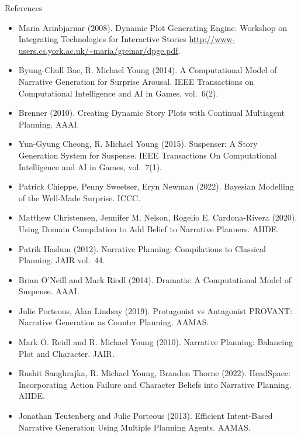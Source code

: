 \documentclass[utf8,13pt]{beamer}
\begin{document}
\begin{frame}{References}
  \footnotesize
  \begin{itemize}
  \item Maria Arinbjarnar (2008). Dynamic Plot Generating Engine.
    Workshop on Integrating Technologies for Interactive Stories
    \url{http://www-users.cs.york.ac.uk/~maria/greinar/dpge.pdf}.
  \item Byung-Chull Bae, R. Michael Young  (2014).
    A Computational Model of Narrative Generation for Surprise Arousal.
    IEEE Transactions on Computational Intelligence and AI in Games,
    vol.\ 6(2).
  \item Brenner (2010).
    Creating Dynamic Story Plots with Continual Multiagent Planning.
    AAAI.
  \item Yun-Gyung Cheong, R. Michael Young (2015).
    Suspenser: A Story Generation System for Suspense.
    IEEE Transactions On Computational Intelligence and AI in Games,
    vol.\ 7(1).
  \item Patrick Chieppe, Penny Sweetser, Eryn Newman (2022).
    Bayesian Modelling of the Well-Made Surprise. ICCC.
  \end{itemize}
\end{frame}

\begin{frame}
  \footnotesize
  \begin{itemize}
  \item Matthew Christensen, Jennifer M. Nelson, Rogelio E. Cardona-Rivera
    (2020).
    Using Domain Compilation to Add Belief to Narrative Planners. AIIDE.
  \item Patrik Haslum (2012).
    Narrative Planning: Compilations to Classical Planning.
    JAIR vol.\ 44.
  \item Brian O'Neill and Mark Riedl (2014).
    Dramatis: A Computational Model of Suspense. AAAI.
  \item Julie Porteous, Alan Lindsay (2019).
    Protagonist vs Antagonist PROVANT: Narrative Generation as Counter
    Planning. AAMAS.
  \item Mark O. Reidl and R. Michael Young (2010).
    Narrative Planning: Balancing Plot and Character.
    JAIR.
  \item Rushit Sanghrajka, R. Michael Young, Brandon Thorne (2022).
    HeadSpace: Incorporating Action Failure and Character Beliefs into
    Narrative Planning. AIIDE.
  \item Jonathan Teutenberg and Julie Porteous (2013).
    Efficient Intent-Based Narrative Generation Using Multiple Planning
    Agents. AAMAS.
  \end{itemize}
\end{frame}
\end{document}

